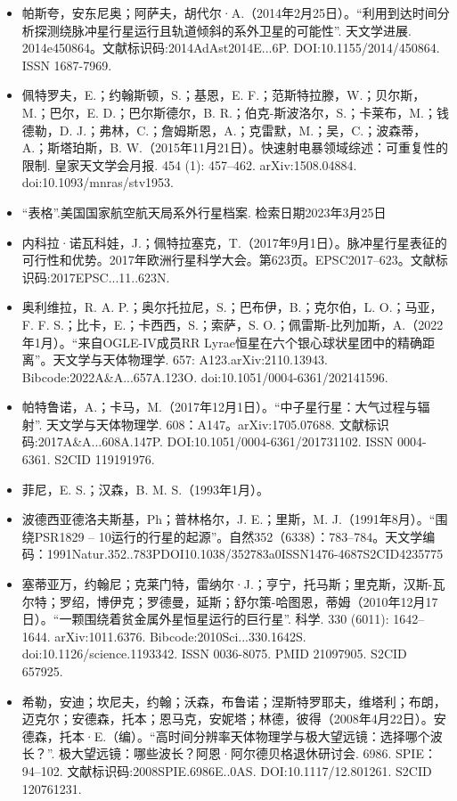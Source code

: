 \begin{itemize}
\item 帕斯夸，安东尼奥；阿萨夫，胡代尔·A.（2014年2月25日）。“利用到达时间分析探测绕脉冲星行星运行且轨道倾斜的系外卫星的可能性”. 天文学进展. 2014e450864。文献标识码:2014AdAst2014E...6P. DOI:10.1155/2014/450864. ISSN 1687-7969.
\item 佩特罗夫，E.；约翰斯顿，S.；基恩，E. F.；范斯特拉滕，W.；贝尔斯，M.；巴尔，E. D.；巴尔斯德尔，B. R.；伯克-斯波洛尔，S.；卡莱布，M.；钱德勒，D. J.；弗林，C.；詹姆斯恩，A.；克雷默，M.；吴，C.；波森蒂，A.；斯塔珀斯，B. W.（2015年11月21日）。快速射电暴领域综述：可重复性的限制. 皇家天文学会月报. 454 (1): 457–462. arXiv:1508.04884. doi:10.1093/mnras/stv1953.
\item “表格”.美国国家航空航天局系外行星档案. 检索日期2023年3月25日
\item 内科拉·诺瓦科娃，J.；佩特拉塞克，T.（2017年9月1日）。脉冲星行星表征的可行性和优势。2017年欧洲行星科学大会。第623页。EPSC2017–623。文献标识码:2017EPSC...11..623N.
\item 奥利维拉，R. A. P.；奥尔托拉尼，S.；巴布伊，B.；克尔伯，L. O.；马亚，F. F. S.；比卡，E.；卡西西，S.；索萨，S. O.；佩雷斯-比列加斯，A.（2022年1月）。“来自OGLE-IV成员RR Lyrae恒星在六个银心球状星团中的精确距离”。天文学与天体物理学. 657: A123.arXiv:2110.13943. Bibcode:2022A&A...657A.123O. doi:10.1051/0004-6361/202141596.
\item 帕特鲁诺，A.；卡马，M.（2017年12月1日）。“中子星行星：大气过程与辐射”. 天文学与天体物理学. 608：A147。arXiv:1705.07688. 文献标识码:2017A&A...608A.147P. DOI:10.1051/0004-6361/201731102. ISSN 0004-6361. S2CID 119191976.
\item 菲尼，E. S.；汉森，B. M. S.（1993年1月）。
\item 波德西亚德洛夫斯基，Ph；普林格尔，J. E.；里斯，M. J.（1991年8月）。“围绕PSR1829 – 10运行的行星的起源”。自然352（6338）：783–784。天文学编码：1991Natur.352..783PDOI10.1038/352783a0ISSN1476-4687S2CID4235775
\item 塞蒂亚万，约翰尼；克莱门特，雷纳尔·J.；亨宁，托马斯；里克斯，汉斯-瓦尔特；罗绍，博伊克；罗德曼，延斯；舒尔策-哈图恩，蒂姆（2010年12月17日）。“一颗围绕着贫金属外星恒星运行的巨行星”. 科学. 330 (6011): 1642–1644. arXiv:1011.6376. Bibcode:2010Sci...330.1642S. doi:10.1126/science.1193342. ISSN 0036-8075. PMID 21097905. S2CID 657925.
\item 希勒，安迪；坎尼夫，约翰；沃森，布鲁诺；涅斯特罗耶夫，维塔利；布朗，迈克尔；安德森，托本；恩马克，安妮塔；林德，彼得（2008年4月22日）。安德森，托本·E.（编）。“高时间分辨率天体物理学与极大望远镜：选择哪个波长？”. 极大望远镜：哪些波长？阿恩·阿尔德贝格退休研讨会. 6986. SPIE：94–102. 文献标识码:2008SPIE.6986E..0AS. DOI:10.1117/12.801261. S2CID 120761231.

\end{itemize}
